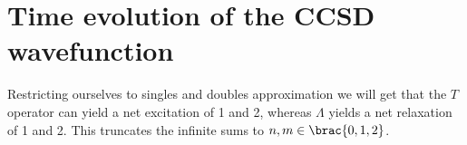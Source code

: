     \section{Time evolution of the CCSD wavefunction}
        Restricting ourselves to singles and doubles approximation we will get
        that the $T$ operator can yield a net excitation of 1 and 2, whereas
        $\Lambda$ yields a net relaxation of 1 and 2. This truncates the
        infinite sums to $n, m \in \brac{0, 1, 2}$.
